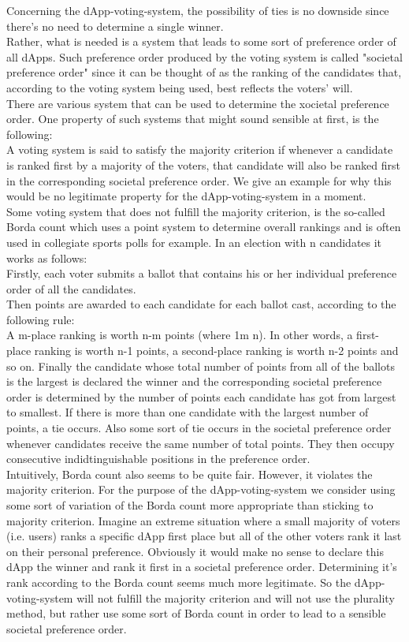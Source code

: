Concerning the dApp-voting-system, the possibility of ties is no downside since there's no need to determine a single winner.\\ %
Rather, what is needed is a system that leads to some sort of preference order of all dApps. Such preference order produced by the voting system is called "societal preference order" since it can be thought of as the ranking of the candidates that, according to the voting system being used, best reflects the voters' will. \\
There are various system that can be used to determine the xocietal preference order. One property of such systems that might sound sensible at first, is the following: \\
A voting system is said to satisfy the majority criterion if whenever a candidate is ranked first by a majority of the voters, that candidate will also be ranked first in the corresponding societal preference order. We give an example for why this would be no legitimate property for the dApp-voting-system in a moment.\\
Some voting system that does not fulfill the majority criterion, is the so-called Borda count which uses a point system to determine overall rankings and is often used in collegiate sports polls for example. In an election with n candidates it works as follows: \\
Firstly, each voter submits a ballot that contains his or her individual preference order of all the candidates. \\
Then points are awarded to each candidate for each ballot cast, according to the following rule: \\
A m-place ranking is worth n-m points (where 1\leq m \leq n). In other words, a first-place ranking is worth n-1 points, a second-place ranking is worth n-2 points and so on. 
Finally the candidate whose total number of points from all of the ballots is the largest is declared the winner and the corresponding societal preference order is determined by the number of points each candidate has got from largest to smallest. If there is more than one candidate with the largest number of points, a tie occurs. Also some sort of tie occurs in the societal preference order whenever candidates receive the same number of total points. They then occupy consecutive indidtinguishable positions in the preference order. \\
Intuitively, Borda count also seems to be quite fair. However, it violates the majority criterion. For the purpose of the dApp-voting-system we consider using some sort of variation of the Borda count more appropriate than sticking to majority criterion. Imagine an extreme situation where a small majority of voters (i.e. users) ranks a specific dApp first place but all of the other voters rank it last on their personal preference. Obviously it would make no sense to declare this dApp the winner and rank it first in a societal preference order. Determining it's rank according to the Borda count seems much more legitimate. So the dApp-voting-system will not fulfill the majority criterion and will not use the plurality method, but rather use some sort of Borda count in order to lead to a sensible societal preference order. 



